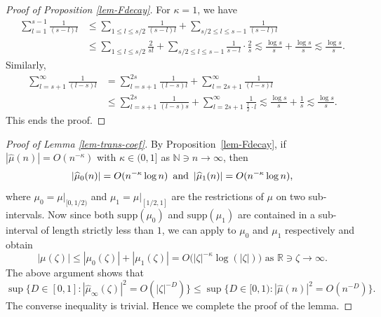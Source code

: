 \documentclass[12pt]{amsart}
\theoremstyle{definition}
\theoremstyle{remark}
\newcommand{\R}{\mathbb{R}}
\newcommand{\N}{\mathbb{N}}
\newcommand{\supp}{\mathrm{supp}}
\newcommand{\an}{\text{\, and \,}}
\numberwithin{equation}{section}
\begin{document}
\begin{proof}[Proof of Proposition \ref{lem-Fdecay}]
For $\kappa = 1$, we have 
\begin{align*}
\sum_{l=1}^{s-1}      \frac{1}{(s-l) l}  &  \le \sum_{1\le l \le s/2} \frac{1}{(s-l) l}  + \sum_{s/2 \le l \le s-1} \frac{1}{(s-l) l}  
\\
&\le \sum_{1\le l \le s/2} \frac{2}{s l} + \sum_{s/2 \le l \le s-1} \frac{1}{s-l} \cdot     \frac{2}{s}  \lesssim  \frac{\log s}{s} + \frac{\log s}{s} \lesssim \frac{\log s}{s}.
\end{align*}
Similarly, 
\begin{align*}
\sum_{l = s+1}^\infty  \frac{1}{(l-s) l}  & = \sum_{l = s+1}^{2s}  \frac{1}{(l-s) l}  + \sum_{l = 2s+1}^\infty  \frac{1}{(l-s) l}  
\\
& \le \sum_{l = s+1}^{2s}  \frac{1}{(l-s) s} + \sum_{l = 2s+1}^{\infty}  \frac{1}{ \frac{l}{2} \cdot l}  \lesssim  \frac{ \log s}{s}+ \frac{1}{s} \lesssim  \frac{ \log s}{s}. 
\end{align*}
This ends the proof. 
\end{proof}





\begin{proof}[Proof of Lemma \ref{lem-trans-coef}]
By Proposition~\ref{lem-Fdecay},  if $|\widehat{\mu}(n)|  = O(n^{-\kappa})$ with $\kappa \in (0, 1]$ as $\N\ni n\to\infty$, then 
\[
|\widehat{\mu}_0(n)|  = O(n^{-\kappa} \log n) \an  |\widehat{\mu}_1(n)| = O(n^{-\kappa} \log n),
\]
where $\mu_0 = \mu|_{[0,1/2)}$ and $\mu_1= \mu|_{[1/2, 1]}$ are the restrictions of $\mu$ on two sub-intervals. Now since both $\supp(\mu_0)$ and $\supp(\mu_1)$ are contained in a sub-interval of length strictly less than $1$,  we can apply \cite[Chapter 17, Lemma 1]{Kahane-book} to $\mu_0$ and $\mu_1$ respectively and obtain 
\[
\text{$|\mu(\zeta)| \le    |\mu_0(\zeta)|  + |\mu_1(\zeta)|   = O  \big( |\zeta|^{-\kappa} \log (|\zeta|)\big)$ as $\R\ni \zeta \to \infty$.}
\]
The above argument shows that 
\[
 \sup\{D \in[0,1]:   |\widehat{\mu}_\infty(\zeta)|^2 = O(|\zeta|^{-D}) \}     \le    \sup \{ D \in [0,1):     |\widehat{\mu}(n)|^2  = O(n^{-D})   \}.
\]
The converse inequality is trivial. Hence we complete the proof of the lemma. 
\end{proof}
\end{document}
